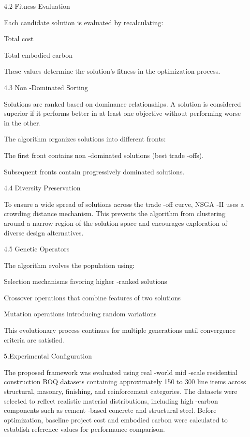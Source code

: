 \documentclass[10pt,twocolumn]{article}
\begin{document}
4.2 Fitness Evaluation  
 
Each candidate solution is evaluated by recalculating:  
 
Total cost  
 
Total embodied carbon  
 
These values determine the solution’s fitness in the optimization process.  
 
4.3 Non -Dominated Sorting  
 
Solutions are ranked based on dominance relationships. A solution is considered superior if it 
performs better in at least one objective without performing worse in the other.  
 
The algorithm organizes solutions into different fronts:  
 
The first front contains non -dominated solutions (best trade -offs).  
 
Subsequent fronts contain progressively dominated solutions.  
 
4.4 Diversity Preservation  
 
To ensure a wide spread of solutions across the trade -off curve, NSGA -II uses a crowding distance 
mechanism. This prevents the algorithm from clustering around a narrow region of the solution 
space and encourages exploration of diverse design alternatives.  
 
4.5 Genetic Operators  
 
The algorithm evolves the population using:  
 
Selection mechanisms favoring higher -ranked solutions  
 
Crossover operations that combine features of two solutions  
 
Mutation operations introducing random variations  
 
This evolutionary process continues for multiple generations until convergence criteria are satisfied.  
 
5.Experimental Configuration  
 
The proposed framework was evaluated using real -world mid -scale residential construction BOQ 
datasets containing approximately 150 to 300 line items across structural, masonry, finishing, and 
reinforcement categories. The datasets were selected to reflect realistic material distributions, 
including high -carbon components such as cement -based concrete and structural steel. Before 
optimization, baseline project cost and embodied carbon were calculated to establish reference 
values for performance comparison.  
 
\end{document}
